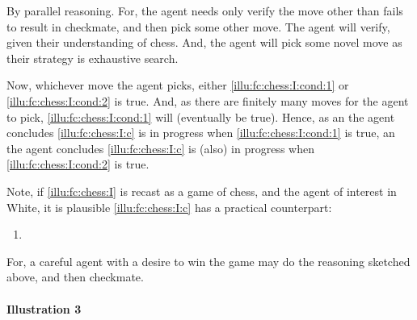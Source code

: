 \begin{note}
\begin{enumerate}[label=\arabic*., ref=(\arabic*)]
    By parallel reasoning.
    For, the agent needs only verify the move other than  fails to result in checkmate, and then pick some other move.
    The agent will verify, given their understanding of chess.
    And, the agent will pick some novel move as their strategy is exhaustive search.
  \end{enumerate}
  Now, whichever move the agent picks, either \ref{illu:fc:chess:I:cond:1} or \ref{illu:fc:chess:I:cond:2} is true.
  And, as there are finitely many moves for the agent to pick, \ref{illu:fc:chess:I:cond:1} will (eventually be true).
  Hence, as an  the agent concludes \ref{illu:fc:chess:I:c} is in progress when \ref{illu:fc:chess:I:cond:1} is true, an  the agent concludes \ref{illu:fc:chess:I:c} is (also) in progress when \ref{illu:fc:chess:I:cond:2} is true.
\end{note}

\begin{note}
  Note, if \autoref{illu:fc:chess:I} is recast as a game of chess, and the agent of interest in White, it is plausible \ref{illu:fc:chess:I:c} has a practical counterpart:
  \begin{enumerate}[label=C\thescenarioCounter\('\)., ref=C\thescenarioCounter\('\)]
  \item
    \label{illu:fc:chess:I:c:p}
  \end{enumerate}
  For, a careful agent with a desire to win the game may do the reasoning sketched above, and then checkmate.
\end{note}



\paragraph{Illustration 3}

